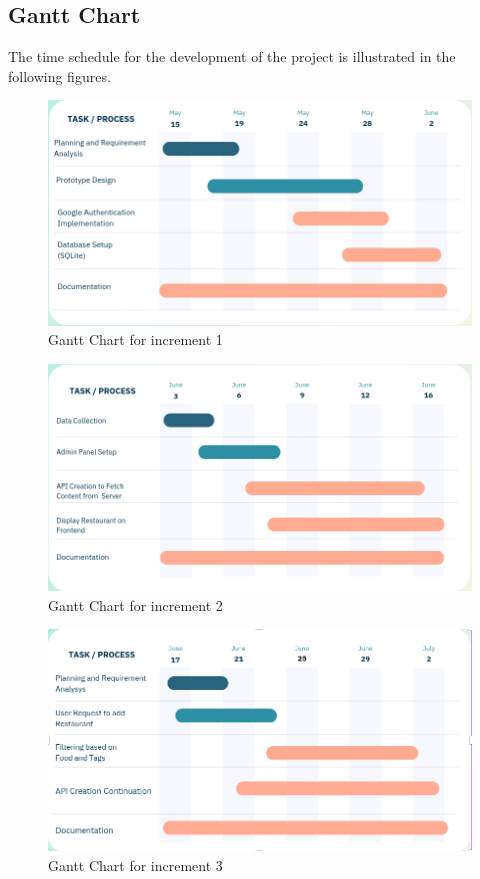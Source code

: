 \documentclass[12pt, a4paper, oneside]{article}
\begin{document}
\subsection{Gantt Chart}
The time schedule for the development of the project is illustrated in the
following figures.
 \begin{figure}[h!]
	\includegraphics[width=\linewidth]{images/1.png}
	\centering
	\caption{Gantt Chart for increment 1}
	\label{fig:schedule1}
 \end{figure}
 \begin{figure}[h!]
	\includegraphics[width=\linewidth]{images/2.png}
	\centering
	\caption{Gantt Chart for increment 2}
	\label{fig:schedule2}
 \end{figure}
 \begin{figure}[h!]
	\includegraphics[width=\linewidth]{images/3.png}
	\centering
	\caption{Gantt Chart for increment 3}
	\label{fig:schedule3}
 \end{figure}
\end{document}

